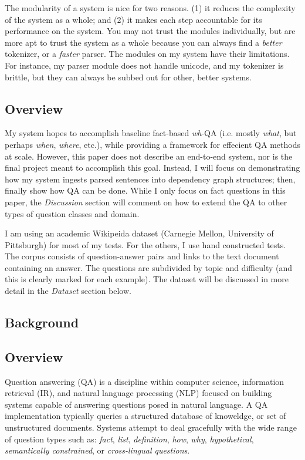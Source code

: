 \documentclass[twoside]{article}
\begin{document}
The modularity of a system is nice for two reasons.  (1) it reduces the complexity of the system as a whole; and (2) it makes each step accountable for its performance on the system.  You may not trust the modules individually, but are more apt to trust the system as a whole because you can always find a \textit{better} tokenizer, or a \textit{faster} parser.  The modules on my system have their limitations.  For instance, my parser module does not handle unicode, and my tokenizer is brittle, but they can always be subbed out for other, better systems.

\subsection{Overview}

My system hopes to accomplish baseline fact-based \textit{wh}-QA (i.e. mostly \textit{what}, but perhaps \textit{when}, \textit{where}, etc.), while providing a framework for effecient QA methods at scale. However, this paper does not describe an end-to-end system, nor is the final project meant to accomplish this goal.  Instead, I will focus on demonstrating how my system ingests parsed sentences into dependency graph structures; then, finally show how QA can be done.  While I only focus on fact questions in this paper, the \textit{Discussion} section will comment on how to extend the QA to other types of question classes and domain.

I am using an academic Wikipeida dataset (Carnegie Mellon, University of Pittsburgh) for most of my tests.  For the others, I use hand constructed tests.  The corpus consists of question-answer pairs and links to the text document containing an answer.  The questions are subdivided by topic and difficulty (and this is clearly marked for each example). The dataset will be discussed in more detail in the \textit{Dataset} section below.

\subsection{Background}

\subsection{Overview}

Question answering (QA) is a discipline within computer science, information retrieval (IR), and natural language processing (NLP) focused on building systems capable of answering questions posed in natural language. A QA implementation typically queries a structured database of knoweldge, or set of unstructured documents.  Systems attempt to deal gracefully with the wide range of question types such as: \textit{fact}, \textit{list}, \textit{definition}, \textit{how}, \textit{why}, \textit{hypothetical}, \textit{semantically constrained}, or \textit{cross-lingual questions}.
\end{document}
